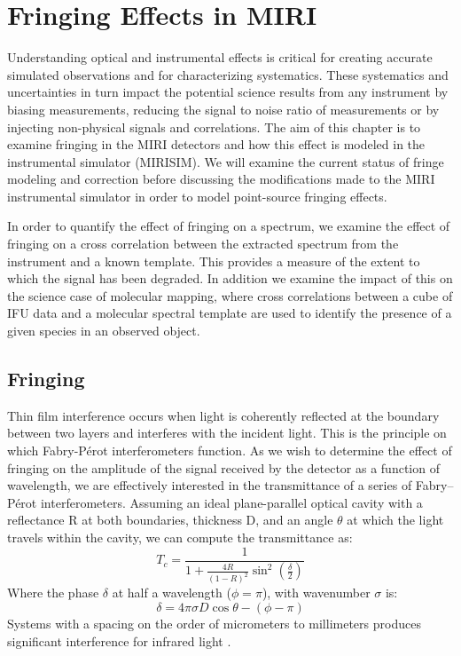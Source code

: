 \chapter{Fringing Effects in MIRI}\label{ch:fringe}
Understanding optical and instrumental effects is critical for creating accurate simulated observations and for characterizing systematics. 
These systematics and uncertainties in turn impact the potential science results from any instrument by biasing measurements, reducing the signal to noise ratio of measurements or by injecting non-physical signals and correlations.
The aim of this chapter is to examine fringing in the MIRI detectors and how this effect is modeled in the instrumental simulator (MIRISIM). 
We will examine the current status of fringe modeling and correction before discussing the modifications made to the MIRI instrumental simulator in order to model point-source fringing effects.

In order to quantify the effect of fringing on a spectrum, we examine the effect of fringing on a cross correlation between the extracted spectrum from the instrument and a known template. 
This provides a measure of the extent to which the signal has been degraded.
In addition we examine the impact of this on the science case of molecular mapping, where cross correlations between a cube of IFU data and a molecular spectral template are used to identify the presence of a given species in an observed object. 

\section{Fringing}
Thin film interference occurs when light is coherently reflected at the boundary between two layers and interferes with the incident light.
This is the principle on which Fabry-P\'{e}rot interferometers function.
As we wish to determine the effect of fringing on the amplitude of the signal received by the detector as a function of wavelength, we are effectively interested in the transmittance of a series of Fabry--P\'{e}rot interferometers. 
Assuming an ideal plane-parallel optical cavity with a reflectance R at both boundaries, thickness D, and an angle $\theta$ at which the light travels within the cavity, we can compute the transmittance as:
\begin{equation}\label{eqn:trans}
T_{c} = \frac{1}{1+\frac{4R}{\left(1-R\right)^{2}}\sin^{2}\left(\frac{\delta}{2}\right)}
\end{equation}
Where the phase $\delta$ at half a wavelength ($\phi = \pi$), with wavenumber $\sigma$ is:
\begin{equation}\label{eqn:phase}
\delta = 4\pi\sigma D \cos\theta - (\phi - \pi)
\end{equation}
Systems with a spacing on the order of micrometers to millimeters produces significant interference for infrared light \parencite{Lahuis2003}.

